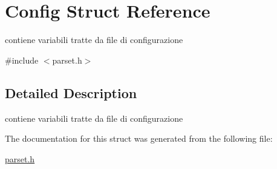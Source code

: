 \hypertarget{structConfig}{}\section{Config Struct Reference}
\label{structConfig}


contiene variabili tratte da file di configurazione  




{\ttfamily \#include $<$parset.\+h$>$}



\subsection{Detailed Description}
contiene variabili tratte da file di configurazione 

The documentation for this struct was generated from the following file\+:\begin{DoxyCompactItemize}
\item 
\hyperlink{parset_8h}{parset.\+h}\end{DoxyCompactItemize}
